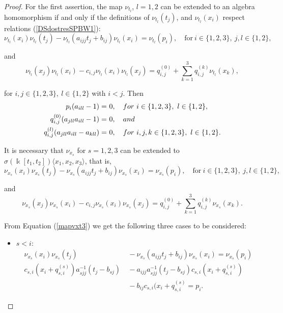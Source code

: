 \documentclass{amsart}
\theoremstyle{definition}
\theoremstyle{remark}
\numberwithin{equation}{section}
\begin{document}
\begin{proof}
For the first assertion, the map $\nu_{t_l}$, $l=1, 2$ can be extended to an algebra homomorphism if and only if the definitions of $\nu_{t_l}(t_j)$,  and $\nu_{t_l}(x_i)$ respect relations  {\rm (}\ref{DSdostresSPBW1}{\rm )}: 
\begin{equation*}
\nu_{t_l}(x_i)\nu_{t_l}(t_j)-\nu_{t_l}(a_{ijj}t_j+b_{ij})\nu_{t_l}(x_i) = \nu_{t_l}(p_i), \quad \text{for}\ i\in\{1, 2, 3\},\ j, l \in \{1, 2\},
\end{equation*}

and
\begin{equation*}
\nu_{t_l}(x_j)\nu_{t_l}(x_i)-c_{i,j}\nu_{t_l}(x_i)\nu_{t_l}(x_j) = q_{i,j}^{(0)}+\sum_{k=1}^{3}q_{i,j}^{(k)}\nu_{t_l}(x_k), 
\end{equation*}

for $i, j \in \{1, 2, 3\}, \ l \in \{1, 2\}$ with $i < j$. Then
\begin{align}
p_i(a_{ill}-1) = &\ 0, \quad {\rm for}\ i \in\{1, 2, 3\}, \ l \in \{1, 2\}, \notag \\
q_{i,j}^{(0)}(a_{jll}a_{ill}-1) = &\ 0, \quad {\rm and} \label{firstsecondrel33} \\
q_{i,j}^{(l)}(a_{jll}a_{ill}-a_{kll}) = &\ 0, \quad {\rm for} \ i, j,k \in \{1, 2, 3\}, \ l \in \{1, 2\}. \notag 
\end{align}

It is necessary that $\nu_{x_s}$ for $s = 1, 2, 3$ can be extended to $\sigma(\Bbbk[t_1, t_2])\langle x_1, x_2, x_3\rangle$, that is, 
\begin{equation}\label{mapvxt3}
\nu_{x_s}(x_i)\nu_{x_s}(t_j)-\nu_{x_s}(a_{ijj}t_j+b_{ij})\nu_{x_s}(x_i) = \nu_{x_s}(p_i), \quad \text{for}\ i\in\{1, 2, 3\},\ j, l \in \{1, 2\},
\end{equation}

and
\begin{equation}\label{mapvxx33}
\nu_{x_s}(x_j)\nu_{x_s}(x_i)-c_{i,j}\nu_{x_s}(x_i)\nu_{x_s}(x_j) = q_{i,j}^{(0)}+\sum_{k=1}^{3}q_{i,j}^{(k)}\nu_{x_s}(x_k).
\end{equation}

From Equation {\rm (}\ref{mapvxt3}{\rm )} we get the following three cases to be considered:
\begin{itemize}
    \item $s < i$:
    \begin{align*}
     \nu_{x_s}(x_i)\nu_{x_s}(t_j) &\ - \nu_{x_s}(a_{ijj}t_j+b_{ij})\nu_{x_s}(x_i) = \nu_{x_s}(p_i)\\
     c_{s,i}(x_i+q_{s,i}^{(s)})a_{sjj}^{-1}(t_j-b_{sj}) &\ - a_{ijj}a_{sjj}^{-1}(t_j-b_{sj})c_{s,i}(x_i+q_{s,i}^{(s)}) \\
        &\ - b_{ij}c_{s,i}(x_i+q_{s,i}^{(s)}= p_i.
    \end{align*}
    

\end{itemize}
\end{proof}
\end{document}
